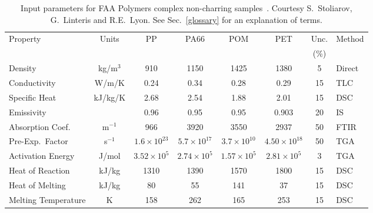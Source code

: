\begin{table}[h!]
\caption[FAA complex non-charring polymer properties]{Input parameters for FAA Polymers complex non-charring samples~\cite{Stoliarov:FM2012}. Courtesy S.~Stoliarov, G.~Linteris and R.E.~Lyon. See Sec.~\ref{glossary} for an explanation of terms.}
\begin{center}
\begin{tabular}{|l|c|c|c|c|c|c|l|}
\hline
Property                    & Units         & PP                    & PA66                  & POM                   & PET                   & Unc.      & Method    \\
                            &               &                       &                       &                       &                       & (\%)      &           \\ \hline \hline
Density                     & kg/m$^3$      & 910                   & 1150                  & 1425                  & 1380                  & 5         & Direct    \\ \hline
Conductivity                & W/m/K         & 0.24                  & 0.34                  & 0.28                  & 0.29                  & 15        & TLC       \\ \hline
Specific Heat               & kJ/kg/K       & 2.68                  & 2.54                  & 1.88                  & 2.01                  & 15        & DSC       \\ \hline
Emissivity                  &               & 0.96                  & 0.95                  & 0.95                  & 0.903                 & 20        & IS        \\ \hline
Absorption Coef.            & m$^{-1}$      & 966                   & 3920                  & 3550                  & 2937                  & 50        & FTIR      \\ \hline
Pre-Exp.~Factor             & s$^{-1}$      & $1.6 \times 10^{23}$  & $5.7 \times 10^{17}$  & $3.7 \times 10^{10}$  & $4.50 \times 10^{18}$ & 50        & TGA       \\ \hline
Activation Energy           & J/mol       & $3.52 \times 10^{5}$  & $2.74 \times 10^{5}$  & $1.57 \times 10^{5}$  & $2.81 \times 10^{5}$  & 3         & TGA       \\ \hline
Heat of Reaction            & kJ/kg         & 1310                  & 1390                  & 1570                  & 1800                  & 15        & DSC       \\ \hline
Heat of Melting             & kJ/kg         & 80                    & 55                    & 141                   & 37                    & 15        & DSC       \\ \hline
Melting Temperature         & K             & 158                   & 262                   & 165                   & 253                   & 15        & DSC       \\ \hline

\end{tabular}
\end{center}
\label{FAA_Properties2}
\end{table}



